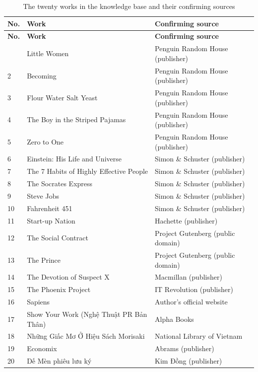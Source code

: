 {\cobang
\begin{longtable}{C{0.9cm}P{7.0cm}P{6.3cm}}
\caption{The twenty works in the knowledge base and their confirming sources}\label{tab:pl-nguon}\\
\toprule
\textbf{No.} & \textbf{Work} & \textbf{Confirming source}\\
\midrule
\endfirsthead
\toprule
\textbf{No.} & \textbf{Work} & \textbf{Confirming source}\\
\midrule
\endhead
\bottomrule
{} & Little Women & Penguin Random House (publisher)\\
2 & Becoming & Penguin Random House (publisher)\\
3 & Flour Water Salt Yeast & Penguin Random House (publisher)\\
4 & The Boy in the Striped Pajamas & Penguin Random House (publisher)\\
5 & Zero to One & Penguin Random House (publisher)\\
6 & Einstein: His Life and Universe & Simon \& Schuster (publisher)\\
7 & The 7 Habits of Highly Effective People & Simon \& Schuster (publisher)\\
8 & The Socrates Express & Simon \& Schuster (publisher)\\
9 & Steve Jobs & Simon \& Schuster (publisher)\\
10 & Fahrenheit 451 & Simon \& Schuster (publisher)\\
11 & Start-up Nation & Hachette (publisher)\\
12 & The Social Contract & Project Gutenberg (public domain)\\
13 & The Prince & Project Gutenberg (public domain)\\
14 & The Devotion of Suspect X & Macmillan (publisher)\\
15 & The Phoenix Project & IT Revolution (publisher)\\
16 & Sapiens & Author's official website\\
17 & Show Your Work (Nghệ Thuật PR Bản Thân) & Alpha Books\\
18 & Những Giấc Mơ Ở Hiệu Sách Morisaki & National Library of Vietnam\\
19 & Economix & Abrams (publisher)\\
20 & Dế Mèn phiêu lưu ký & Kim Đồng (publisher)\\
\end{longtable}
}
